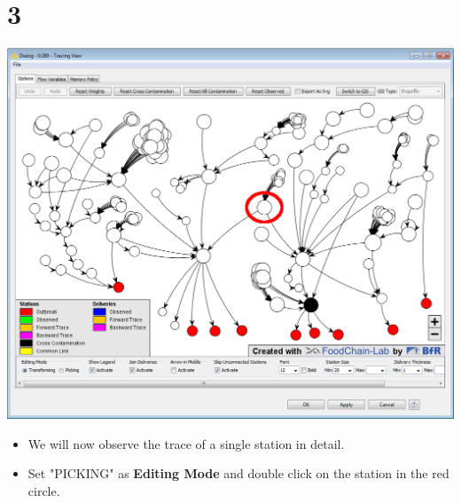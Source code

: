 \documentclass{beamer}
\begin{document}
\section{3}
\begin{frame}
	\begin{center}
  		\includegraphics[height=0.6\textheight]{3.png}
	\end{center}
	\begin{itemize}
		\item We will now observe the trace of a single station in detail.
		\item Set "PICKING" as \textbf{Editing Mode} and double click on the station in the red circle.
	\end{itemize}
\end{frame}
\end{document}
